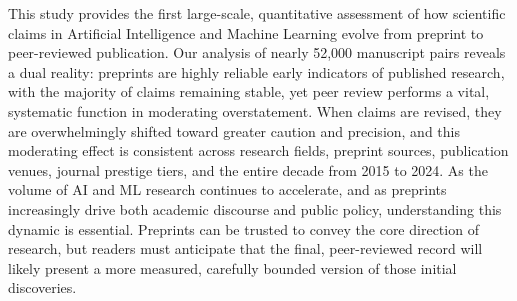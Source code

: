 \documentclass[11pt]{article}
\begin{document}
This study provides the first large-scale, quantitative assessment of how scientific claims in Artificial Intelligence and Machine Learning evolve from preprint to peer-reviewed publication. Our analysis of nearly 52,000 manuscript pairs reveals a dual reality: preprints are highly reliable early indicators of published research, with the majority of claims remaining stable, yet peer review performs a vital, systematic function in moderating overstatement. When claims are revised, they are overwhelmingly shifted toward greater caution and precision, and this moderating effect is consistent across research fields, preprint sources, publication venues, journal prestige tiers, and the entire decade from 2015 to 2024. As the volume of AI and ML research continues to accelerate, and as preprints increasingly drive both academic discourse and public policy, understanding this dynamic is essential. Preprints can be trusted to convey the core direction of research, but readers must anticipate that the final, peer-reviewed record will likely present a more measured, carefully bounded version of those initial discoveries.



\end{document}
